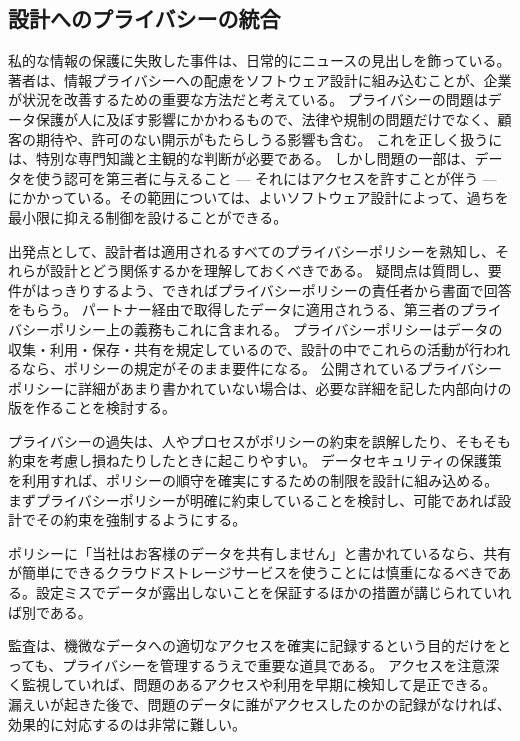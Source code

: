 \documentclass[uplatex]{jsarticle}
\def\label#1{}%
\begin{document}
\subsection{設計へのプライバシーの統合}\label{subsec:ch6-integrating-privacy}

私的な情報の保護に失敗した事件は、日常的にニュースの見出しを飾っている。
著者は、情報プライバシーへの配慮をソフトウェア設計に組み込むことが、企業が状況を改善するための重要な方法だと考えている。
プライバシーの問題はデータ保護が人に及ぼす影響にかかわるもので、法律や規制の問題だけでなく、顧客の期待や、許可のない開示がもたらしうる影響も含む。
これを正しく扱うには、特別な専門知識と主観的な判断が必要である。
しかし問題の一部は、データを使う認可を第三者に与えること --- それにはアクセスを許すことが伴う --- にかかっている。その範囲については、よいソフトウェア設計によって、過ちを最小限に抑える制御を設けることができる。

出発点として、設計者は適用されるすべてのプライバシーポリシーを熟知し、それらが設計とどう関係するかを理解しておくべきである。
疑問点は質問し、要件がはっきりするよう、できればプライバシーポリシーの責任者から書面で回答をもらう。
パートナー経由で取得したデータに適用されうる、第三者のプライバシーポリシー上の義務もこれに含まれる。
プライバシーポリシーはデータの収集・利用・保存・共有を規定しているので、設計の中でこれらの活動が行われるなら、ポリシーの規定がそのまま要件になる。
公開されているプライバシーポリシーに詳細があまり書かれていない場合は、必要な詳細を記した内部向けの版を作ることを検討する。

プライバシーの過失は、人やプロセスがポリシーの約束を誤解したり、そもそも約束を考慮し損ねたりしたときに起こりやすい。
データセキュリティの保護策を利用すれば、ポリシーの順守を確実にするための制限を設計に組み込める。
まずプライバシーポリシーが明確に約束していることを検討し、可能であれば設計でその約束を強制するようにする。

\begin{exa}\label{exa:ch6-no-sharing-policy}
ポリシーに「当社はお客様のデータを共有しません」と書かれているなら、共有が簡単にできるクラウドストレージサービスを使うことには慎重になるべきである。設定ミスでデータが露出しないことを保証するほかの措置が講じられていれば別である。
\end{exa}

監査は、機微なデータへの適切なアクセスを確実に記録するという目的だけをとっても、プライバシーを管理するうえで重要な道具である。
アクセスを注意深く監視していれば、問題のあるアクセスや利用を早期に検知して是正できる。
漏えいが起きた後で、問題のデータに誰がアクセスしたのかの記録がなければ、効果的に対応するのは非常に難しい。
\end{document}
